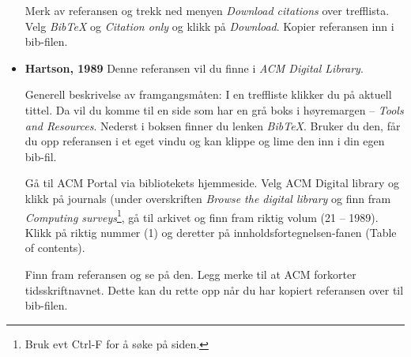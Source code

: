 \documentclass[11pt,norsk,a4paper]{article}
\newcommand{\bt}{BibTeX{}}
\begin{document}
\begin{itemize}
Merk av referansen og trekk ned menyen \textit{Download citations}
over trefflista. Velg \textit{BibTeX} og \textit{Citation only} og
klikk på \textit{Download}. Kopier referansen inn i
bib-filen.


\item\textbf{Hartson, 1989\cite{hartson1989}}\newline
Denne referansen vil du finne i \textit{ACM Digital Library}.

  Generell beskrivelse av framgangsmåten: I en treffliste klikker du
  på aktuell tittel. Da vil du komme til en side som har en grå boks i
  høyremargen -- \textit{Tools and Resources}. Nederst i boksen finner
  du lenken \textit{\bt}. Bruker du den, får du opp
  referansen i et eget vindu og kan klippe og lime den inn i din egen
  bib-fil.

  Gå til ACM Portal via bibliotekets hjemmeside. Velg ACM Digital
  library og klikk på journals (under overskriften \textit{Browse the
    digital library} og finn fram \textit{Computing
    surveys}\footnote{Bruk evt Ctrl-F for å søke på siden.}, gå til
  arkivet og finn fram riktig volum (21 -- 1989). Klikk på riktig
  nummer (1) og deretter på innholdsfortegnelsen-fanen (Table of
  contents).

Finn fram referansen og se på den. Legg merke til at ACM forkorter
tidsskriftnavnet.  Dette kan du rette opp når du har kopiert
referansen over til bib-filen.





\end{itemize}
\end{document}

